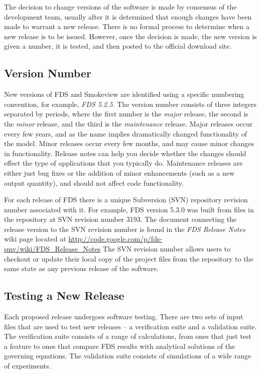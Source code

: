 \documentclass[11pt]{book}
\begin{document}
The decision to change versions of the software is made by consensus of the development team, usually after it is determined that enough
changes have been made to warrant a new release. There is no formal process to determine when a new release is to be issued. However, once the
decision is made, the new version is given a number, it is tested, and then posted to the official download site.

\subsection{Version Number}

New versions of FDS and Smokeview are identified using a specific numbering convention, for example, {\em FDS 5.2.5}.
The version number consists of three integers separated by periods, where the first number
is the {\em major} release, the second is the {\em minor} release, and the third is the {\em maintenance}
release.  Major releases occur every few years, and as the name implies dramatically changed functionality of the
model. Minor releases occur every few months, and may cause minor changes in functionality.
Release notes can help you decide whether the changes should effect the type of applications that you typically do.
Maintenance releases are either just bug fixes or the addition of minor enhancements (such as a new output quantity),
and should not affect code functionality.

For each release of FDS there is a unique Subversion (SVN) repository revision number associated with it.
For example, FDS version 5.3.0 was built from files in the repository at SVN revision number 3193.
The document connecting the release version to the SVN revision number is found in the {\em FDS Release Notes} wiki page
located at \href{http://code.google.com/p/fds-smv/wiki/FDS_Release_Notes}{{\ct http://code.google.com/p/fds-smv/wiki/FDS\_Release\_Notes}}
The SVN revision number allows users to checkout or update their local copy of the project files from the repository to the same state as any previous release of the software.

\subsection{Testing a New Release}

Each proposed release undergoes software testing.  There are two sets of input files that are used to test new releases --
a verification suite and a validation suite. The verification suite consists of a range of calculations, from ones that just test a feature to
ones that compare FDS results with analytical solutions of the governing equations. The validation suite consists of simulations of a wide range
of experiments.
\end{document}
